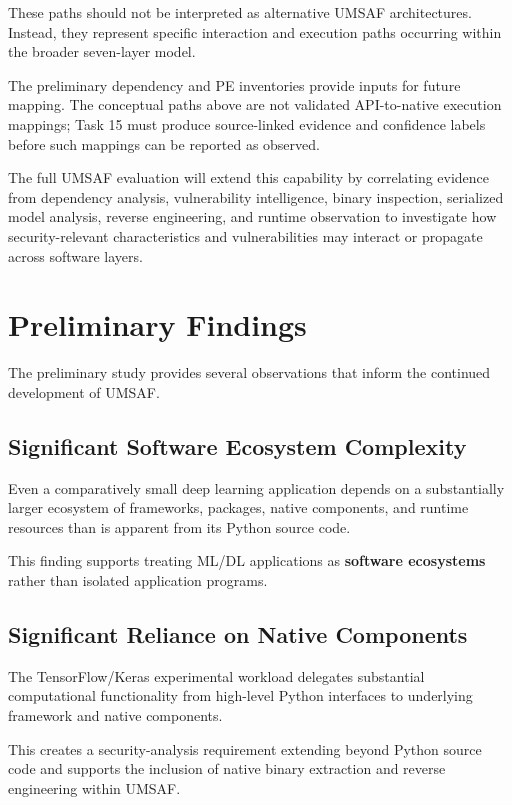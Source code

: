 \documentclass[
  12pt,
  letterpaper,
  oneside]{report}
\begin{document}
These paths should not be interpreted as alternative UMSAF
architectures. Instead, they represent specific interaction and
execution paths occurring within the broader seven-layer model.

The preliminary dependency and PE inventories provide inputs for future
mapping. The conceptual paths above are not validated API-to-native
execution mappings; Task 15 must produce source-linked evidence and
confidence labels before such mappings can be reported as observed.

The full UMSAF evaluation will extend this capability by correlating
evidence from dependency analysis, vulnerability intelligence, binary
inspection, serialized model analysis, reverse engineering, and runtime
observation to investigate how security-relevant characteristics and
vulnerabilities may interact or propagate across software layers.

\section{Preliminary Findings}\label{910-preliminary-findings}

The preliminary study provides several observations that inform the
continued development of UMSAF.

\subsection{Significant Software Ecosystem Complexity}\label{1-significant-software-ecosystem-complexity}

Even a comparatively small deep learning application depends on a
substantially larger ecosystem of frameworks, packages, native
components, and runtime resources than is apparent from its Python
source code.

This finding supports treating ML/DL applications as \textbf{software
ecosystems} rather than isolated application programs.

\subsection{Significant Reliance on Native Components}\label{2-significant-reliance-on-native-components}

The TensorFlow/Keras experimental workload delegates substantial
computational functionality from high-level Python interfaces to
underlying framework and native components.

This creates a security-analysis requirement extending beyond Python
source code and supports the inclusion of native binary extraction and
reverse engineering within UMSAF.
\end{document}
